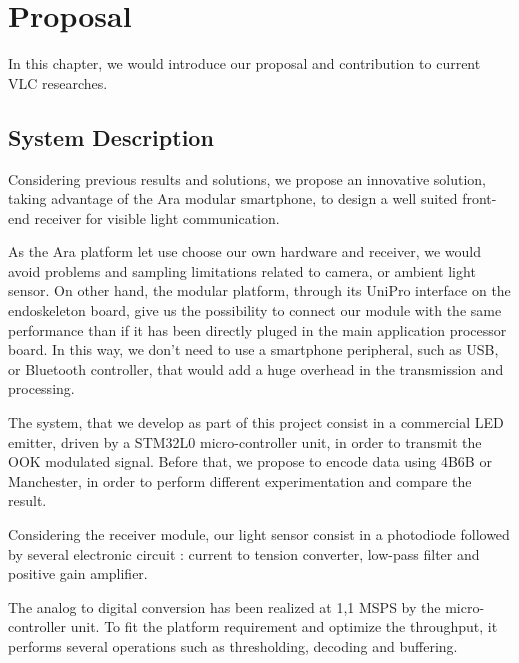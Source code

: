 
\chapter{Proposal} %

\label{Proposal} %


In this chapter, we would introduce our proposal and contribution to current VLC researches. 


\section{System Description}


Considering previous results and solutions, we propose an innovative solution, taking advantage of the Ara modular smartphone,
to design a well suited front-end receiver for visible light communication.

As the Ara platform let use choose our own hardware and receiver, we would avoid problems and sampling limitations related to camera, or ambient light sensor.
On other hand, the modular platform, through its UniPro interface on the endoskeleton board, give us the possibility to connect our module with the same performance than if it has been directly pluged in the main application processor board.
In this way, we don't need to use a smartphone peripheral, such as USB, or Bluetooth controller, that would add a huge overhead in the transmission and processing.

The system, that we develop as part of this project consist in a commercial LED emitter, driven by a STM32L0 micro-controller unit, in order to transmit the OOK modulated signal. Before that, we propose to encode data using 4B6B or Manchester, in order to perform different experimentation and compare the result.

Considering the receiver module, our light sensor consist in a photodiode followed by several electronic circuit : current to tension converter, low-pass filter and positive gain amplifier.

The analog to digital conversion has been realized at 1,1 MSPS by the micro-controller unit. To fit the platform requirement and optimize the throughput, it performs several operations such as thresholding, decoding and buffering.

